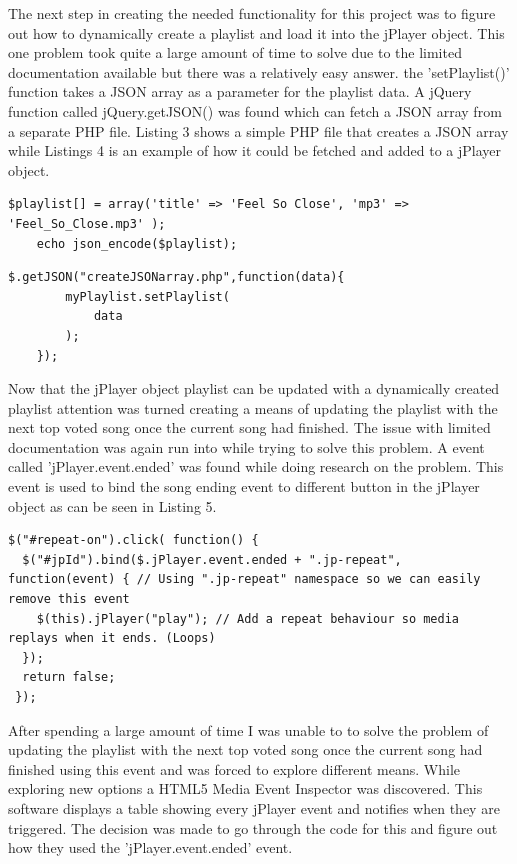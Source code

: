 \documentclass[a4paper, 12pt]{report}
\begin{document}
The next step in creating the needed functionality for this project was to figure out how to dynamically create a playlist and load it into the jPlayer object. This one problem took quite a large amount of time to solve due to the limited documentation available but there was a relatively easy answer. the 'setPlaylist()' function takes a JSON array as a parameter for the playlist data. A jQuery function called jQuery.getJSON()\cite{getJSON} was found which can fetch a JSON array from a separate PHP file. Listing 3 shows a simple PHP file that creates a JSON array while Listings 4 is an example of how it could be fetched and added to a jPlayer object.

\begin{lstlisting}[caption=PHP file creating a JSON array]
	$playlist[] = array('title' => 'Feel So Close', 'mp3' => 'Feel_So_Close.mp3' );
	echo json_encode($playlist);
\end{lstlisting}

\begin{lstlisting}[caption=jQuery.getJSON() used to add playlist to jPlayer object]
	$.getJSON("createJSONarray.php",function(data){
		myPlaylist.setPlaylist(
			data
		);
	});	
\end{lstlisting}

Now that the jPlayer object playlist can be updated with a dynamically created playlist attention was turned creating a means of updating the playlist with the next top voted song once the current song had finished. The issue with limited documentation was again run into while trying to solve this problem. A event called 'jPlayer.event.ended'\cite{jPlayerFunctions} was found while doing research on the problem. This event is used to bind the song ending event to different button in the jPlayer object as can be seen in Listing 5.

\begin{lstlisting}[caption=Example for jPlayer.event.ended]
$("#repeat-on").click( function() {
  $("#jpId").bind($.jPlayer.event.ended + ".jp-repeat", function(event) { // Using ".jp-repeat" namespace so we can easily remove this event
    $(this).jPlayer("play"); // Add a repeat behaviour so media replays when it ends. (Loops)
  });
  return false;
 });
\end{lstlisting}

After spending a large amount of time I was unable to to solve the problem of updating the playlist with the next top voted song once the current song had finished using this event and was forced to explore different means. While exploring new options a HTML5 Media Event\cite{inspector} Inspector was discovered. This software displays a table showing every jPlayer event and notifies when they are triggered. The decision was made to go through the code\cite{inspector-code} for this and figure out how they used the 'jPlayer.event.ended' event. 
\end{document}

